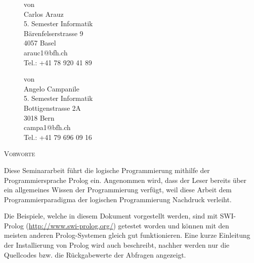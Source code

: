 \documentclass[a4paper, 12pt, DIV11, BCOR5mm, tikz]{scrartcl}
\begin{document}
\begin{titlepage}
\begin{figure}[!hb]
        \begin{minipage}[t][][b]{0.4\textwidth}
            von\\
            Carlos Arauz\\
            5. Semester Informatik\\
            Bärenfelserstrasse 9\\
            4057 Basel\\
            arauc1@bfh.ch\\
            Tel.: +41 78 920 41 89
        \end{minipage}
        \begin{minipage}[t][][b]{0.4\textwidth}
            {\color{white}von}\\
            Angelo Campanile\\
            5. Semester Informatik\\
            Bottigenstrasse 2A\\
            3018 Bern\\
            campa1@bfh.ch\\
            Tel.: +41 79 696 09 16
        \end{minipage}
    \end{figure}
\end{titlepage}
\newpage

\setcounter{page}{2}        %

\noindent
{\scshape\LARGE Vorworte \par}
\vspace{10mm}
\noindent
\justify
Diese Seminararbeit führt die logische Programmierung mithilfe der Programmiersprache Prolog ein.
Angenommen wird, dass der Leser bereits über ein allgemeines Wissen der Programmierung verfügt,
weil diese Arbeit dem Programmierparadigma der logischen Programmierung Nachdruck verleiht.

\noindent
Die Beispiele, welche in diesem Dokument vorgestellt werden, sind mit SWI-Prolog \mbox{(\url{http://www.swi-prolog.org/})}
getestet worden und können mit den meisten anderen Prolog-Systemen gleich gut funktionieren. Eine kurze Einleitung der
Installierung von Prolog wird auch beschreibt, nachher werden nur die Quellcodes bzw. die Rückgabewerte der Abfragen angezeigt.
\end{document}
